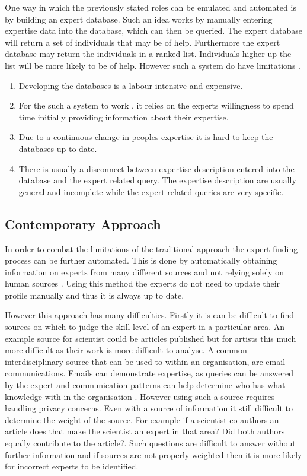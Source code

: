 \documentclass[a4paper,oneside,11pt]{report}
\begin{document}
One way in which the previously stated roles can be emulated and automated is by building an expert database. Such an idea works by manually entering expertise data into the database, which can then be queried. The expert database will return a set of individuals that may be of help. Furthermore the expert database may return the individuals in a ranked list. Individuals higher up the list will be more likely to be of help. However such a system do have limitations \autocite{kobsaseid2003}.
\begin{enumerate}
	\item Developing the databases is a labour intensive and expensive.
	\item For the such a system to work , it relies on the experts willingness to spend time 		  			  initially providing information about their expertise.
	\item Due to a continuous change in peoples expertise it is hard to keep the databases up to 				  date.
	\item There is usually a disconnect between expertise description entered into the database and 	          the expert related query. The expertise description are usually general and incomplete                                                                            		  while the expert related queries are very specific. 
\end{enumerate}

\subsection{Contemporary Approach}
In order to combat the limitations of the traditional approach the expert finding process can be further automated. This is done by automatically obtaining information on experts from many different sources and not relying solely on human sources \autocite{kobsaseid2003}. Using this method the experts do not need to update their profile manually and thus it is always up to date. 

However this approach has many difficulties. Firstly it is can be difficult to find sources on which to judge the skill level of an expert in a particular area. An example source for scientist could be articles published but for artists this much more difficult as their work is more difficult to analyse. A common interdisciplinary source that can be used to within an organisation, are email communications. Emails can demonstrate expertise, as queries can be answered by the expert and communication patterns can help determine who has what knowledge with in the organisation \autocite{campbell2003}. However using such a source requires handling privacy concerns. 
Even with a source of information it still difficult to determine the weight of the source. For example if a scientist co-authors an article does that make the scientist an expert in that area? Did both authors equally contribute to the article?. Such questions are difficult to answer without further information and if sources are not properly weighted then it is more likely for incorrect experts to be identified.
\end{document}
